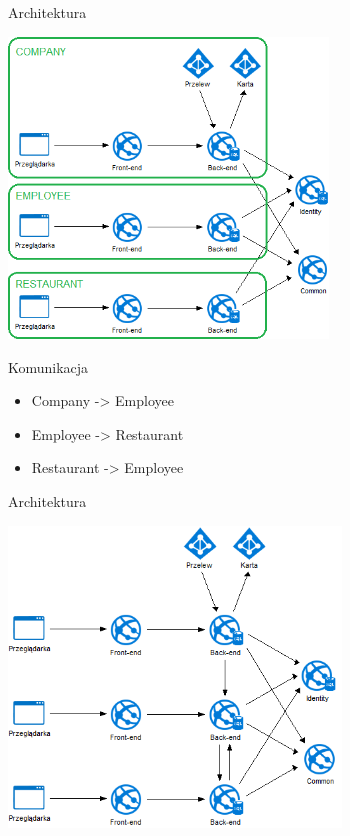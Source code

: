 \documentclass{beamer}
\begin{document}
\begin{frame}{Architektura}
	\begin{center}
		\includegraphics[height=8cm]{architektura4.png}
	\end{center}
\end{frame}

\begin{frame}{Komunikacja}
	\begin{huge}
		\begin{itemize}[<+->]
			\item Company -> Employee
			\item Employee -> Restaurant
			\item Restaurant -> Employee
		\end{itemize}
	\end{huge}
\end{frame}

\begin{frame}{Architektura}
	\begin{center}
		\includegraphics[height=8cm]{architektura3.png}
	\end{center}
\end{frame}
\end{document}
